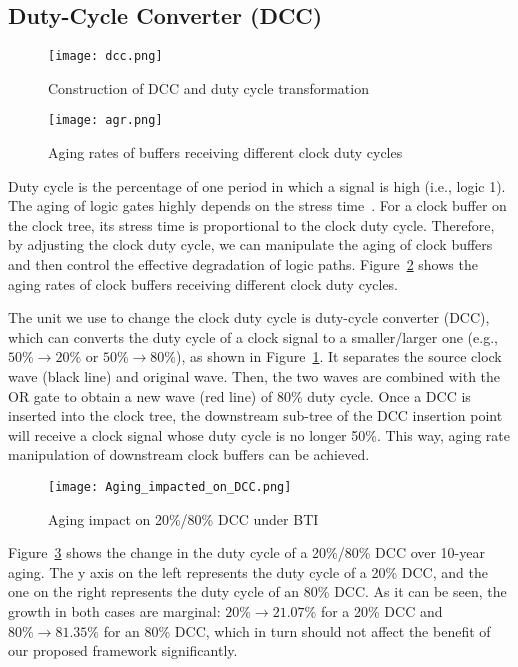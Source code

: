 \subsection{Duty-Cycle Converter (DCC)}
\begin{figure}
    \centering
    \texttt{[image: dcc.png]}
    \caption{Construction of DCC and duty cycle transformation}
    \label{fig:dcc}
\end{figure}

\begin{figure}
    \centering
    \texttt{[image: agr.png]}
    \caption{Aging rates of buffers receiving different clock duty cycles}
    \label{fig:agr}
\end{figure}

Duty cycle is the percentage of one period in which a signal is high (i.e., logic 1). The aging of logic gates highly depends on the stress time~\cite{wang2010impact}. For a clock buffer on the clock tree, its stress time is proportional to the clock duty cycle. Therefore, by adjusting the clock duty cycle, we can manipulate the aging of clock buffers and then control the effective degradation of logic paths. Figure~\ref{fig:agr} shows the aging rates of clock buffers receiving different clock duty cycles. 

The unit we use to change the clock duty cycle is duty-cycle converter (DCC), which can converts the duty cycle of a clock signal to a smaller/larger one (e.g., $50\% \rightarrow 20\%$ or $50\% \rightarrow 80\%$), as shown in Figure~\ref{fig:dcc}. It separates the source clock wave (black line) and original wave. Then, the two waves are combined with the OR gate to obtain a new wave (red line) of 80\% duty cycle. Once a DCC is inserted into the clock tree, the downstream sub-tree of the DCC insertion point will receive a clock signal whose duty cycle is no longer 50\%. This way, aging rate manipulation of downstream clock buffers can be achieved.

\begin{figure}
    \centering
    \texttt{[image: Aging\_impacted\_on\_DCC.png]}
    \caption{Aging impact on 20\%/80\% DCC under BTI}
    \label{fig:exp4}
\end{figure}

Figure~\ref{fig:exp4} shows the change in the duty cycle of a 20\%/80\% DCC over 10-year aging. The y axis on the left represents the duty cycle of a 20\% DCC, and the one on the right represents the duty cycle of an 80\% DCC. As it can be seen, the growth in both cases are marginal: $20\% \to 21.07\%$ for a 20\% DCC and $80\% \to 81.35\%$ for an 80\% DCC, which in turn should not affect the benefit of our proposed framework significantly.

